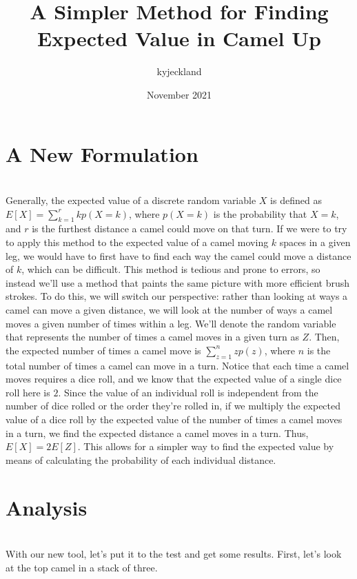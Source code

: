 \documentclass{article}
\title{A Simpler Method for Finding Expected Value in Camel Up}
\author{kyjeckland }
\date{November 2021}
\begin{document}
\maketitle

\section{A New Formulation}
\\ Generally, the expected value of a discrete random variable $X$ is defined as $E[X] = \sum_{k = 1}^{r}kp(X=k)$, where $p(X = k)$ is the probability that $X = k$, and $r$ is the furthest distance a camel could move on that turn. If we were to try to apply this method to the expected value of a camel moving $k$ spaces in a given leg, we would have to first have to find each way the camel could move a distance of $k$, which can be difficult. This method is tedious and prone to errors, so instead we'll use a method that paints the same picture with more efficient brush strokes. To do this, we will switch our perspective: rather than looking at ways a camel can move a given distance, we will look at the number of ways a camel moves a given number of times within a leg. We'll denote the random variable that represents the number of times a camel moves in a given turn as $Z$. Then, the expected number of times a camel move is $\sum_{z=1}^{n}zp(z)$, where $n$ is the total number of times a camel can move in a turn. Notice that each time a camel moves requires a dice roll, and we know that the expected value of a single dice roll here is $2$. Since the value of an individual roll is independent from the number of dice rolled or the order they're rolled in, if we multiply the expected value of a dice roll by the expected value of the number of times a camel moves in a turn, we find the expected distance a camel moves in a turn. Thus, $E[X] = 2E[Z]$. This allows for a simpler way to find the expected value by means of calculating the probability of each individual distance.

\section{Analysis}
\\With our new tool, let's put it to the test and get some results. First, let's look at the top camel in a stack of three.
\end{document}

